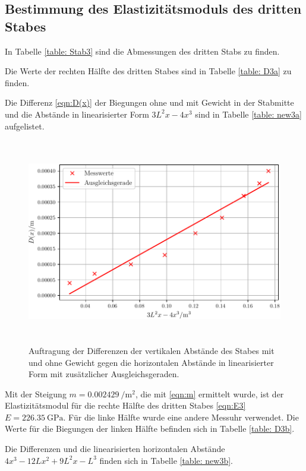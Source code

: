 \subsection{Bestimmung des Elastizitätsmoduls des dritten Stabes}
In Tabelle \ref{table: Stab3} sind die Abmessungen des dritten Stabs zu finden.

Die Werte der rechten Hälfte des dritten Stabes sind in Tabelle \ref{table: D3a} zu finden.

\noindent Die Differenz \eqref{eqn:D(x)} der Biegungen ohne und mit Gewicht in der Stabmitte
und die Abstände in linearisierter Form $3L^2x-4x^3$ sind in Tabelle \ref{table: new3a} aufgelistet.

\begin{figure}

  \centering
  \includegraphics[width=12cm, height=9cm]{./plots/Stange3a.pdf}
  \caption{Auftragung der Differenzen der vertikalen Abstände des Stabes mit und ohne Gewicht gegen die horizontalen Abstände in linearisierter Form mit zusätzlicher Ausgleichsgeraden.}
  \label{fig:plot3a}
\end{figure}
\noindent Mit der Steigung $m = \SI[per-mode=fraction]{0.002429}{\per\square\meter}$, die mit \eqref{eqn:m}%
ermittelt wurde, ist der Elastizitätsmodul für die rechte
Hälfte des dritten Stabes \eqref{eqn:E3} $E =\SI{226.35}{\giga\pascal}$.
\newpage
\noindent Für die linke Hälfte wurde eine andere Messuhr verwendet.
Die Werte für die Biegungen der linken Hälfte befinden sich in Tabelle \ref{table: D3b}.

\noindent Die Differenzen und die linearisierten horizontalen Abstände
$4x^3-12Lx^2+9L^2x-L^3$ finden sich in Tabelle \ref{table: new3b}.
